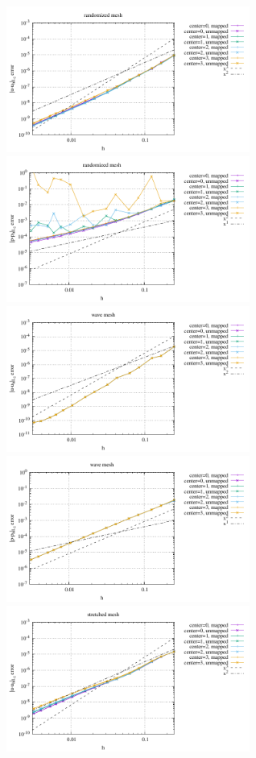 \begin{center}
\includegraphics[width=8cm]{python_codes/fieldstone_76/results/bench4/curved/errors_V_mt2.pdf}
\includegraphics[width=8cm]{python_codes/fieldstone_76/results/bench4/curved/errors_P_mt2.pdf}\\
\includegraphics[width=8cm]{python_codes/fieldstone_76/results/bench4/curved/errors_V_mt3.pdf}
\includegraphics[width=8cm]{python_codes/fieldstone_76/results/bench4/curved/errors_P_mt3.pdf}\\
\includegraphics[width=8cm]{python_codes/fieldstone_76/results/bench4/curved/errors_V_mt4.pdf}

\end{center}
